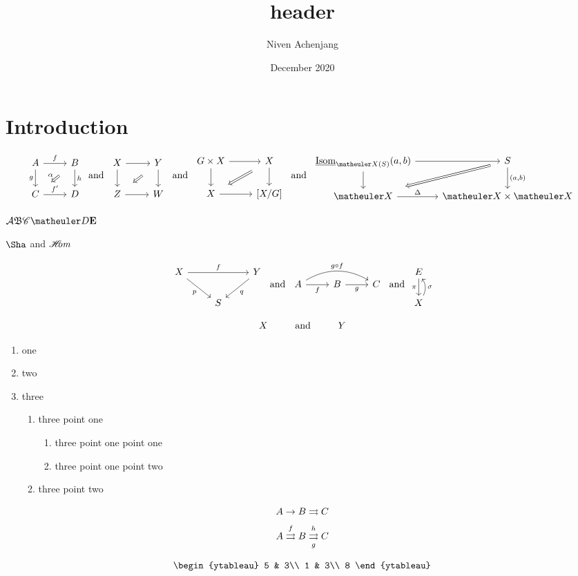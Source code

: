 \documentclass{article}
\title{header}
\author{Niven Achenjang}
\date{December 2020}
\numberwithin{thm}{section}
\numberwithin{prob}{section}
\numberwithin{equation}{section}
\begin{document}
\maketitle

\section{Introduction}

$$\twocommsquare AfBghC{f'}D\alpha\tand\baretwocommsquare XYZW\tand\baretwocommsquare{G\by X}XX{[X/G]}\tand\twocommsquare{\ul\Isom_{\meX(S)}(a,b)}{}S{}{(a,b)}\meX\Delta{\meX\by\meX}{}$$

$\mcA\mf B\msC\meD\mbf E$

$\Sha$ and $\sHom$

$$\mapover XfYpqS\tand\compdiag AfBgC{g\circ f}\tand\mapwithsect E\pi X\sigma$$

$$X\Text{and}\sspacing Y$$

\begin{enumerate}
    \item one
    \item two
    \item three
    \begin{enumerate}
        \item three point one
        \begin{enumerate}
            \item three point one point one
            \item three point one point two
        \end{enumerate}
        \item three point two
    \end{enumerate}
\end{enumerate}
$$A\to B\toto C$$
$$A \xtoto fB \xtoto[g]h C$$

$$\begin{ytableau}
    5 & 3\\
    1 & 3\\
    8
\end{ytableau}$$
\end{document}

